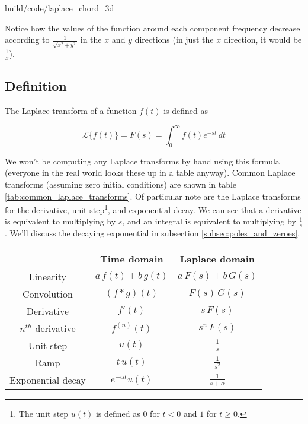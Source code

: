 \begin{svg}{build/code/laplace_chord_3d}
  \caption{Laplace transform of Fmajor4 chord plotted in 3D}
  \label{fig:laplace_chord_3d}
\end{svg}

Notice how the values of the function around each component frequency decrease
according to $\frac{1}{\sqrt{x^2 + y^2}}$ in the $x$ and $y$ directions (in just
the $x$ direction, it would be $\frac{1}{x}$).

\subsection{Definition}

The Laplace transform of a function $f(t)$ is defined as

\begin{equation*}
  \mathcal{L}\{f(t)\} = F(s) = \int_0^\infty f(t) e^{-st} \,dt
\end{equation*}

We won't be computing any Laplace transforms by hand using this formula
(everyone in the real world looks these up in a table anyway). Common Laplace
transforms (assuming zero initial conditions) are shown in table
\ref{tab:common_laplace_transforms}. Of particular note are the Laplace
transforms for the derivative, unit step\footnote{The unit step $u(t)$ is
defined as $0$ for $t < 0$ and $1$ for $t \ge 0$.}, and exponential decay. We
can see that a derivative is equivalent to multiplying by $s$, and an integral
is equivalent to multiplying by $\frac{1}{s}$. We'll discuss the decaying
exponential in subsection \ref{subsec:poles_and_zeroes}.

\begin{booktable}
  \begin{tabular}{|ccc|}
    \hline
    \rowcolor{headingbg}
    & \textbf{Time domain} & \textbf{Laplace domain} \\
    \hline
    Linearity & $a\,f(t) + b\,g(t)$ & $a\,F(s) + b\,G(s)$ \\
    Convolution & $(f * g)(t)$ & $F(s) \,G(s)$ \\
    Derivative & $f'(t)$ & $s \,F(s)$ \\
    $n^{th}$ derivative & $f^{(n)}(t)$ & $s^n \,F(s)$ \\
    Unit step & $u(t)$ & $\frac{1}{s}$ \\
    Ramp & $t \,u(t)$ & $\frac{1}{s^2}$ \\
    Exponential decay & $e^{-\alpha t} u(t)$ & $\frac{1}{s + \alpha}$ \\
    \hline
  \end{tabular}
  \caption{Common Laplace transforms and Laplace transform properties with zero
    initial conditions}
  \label{tab:common_laplace_transforms}
\end{booktable}
